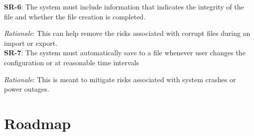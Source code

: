 \documentclass{article}
\begin{document}
\textbf{SR-6}:
The system must include information that indicates the integrity of the file and whether the file creation is completed.

\emph{Rationale}: This can help remove the risks associated with corrupt files during an import or export. \\

\textbf{SR-7}:
The system must automatically save to a file whenever user changes the configuration or at reasonable time intervals

\emph{Rationale}: This is meant to mitigate risks associated with system crashes or power outages.\\



\section{Roadmap}

\end{document}
